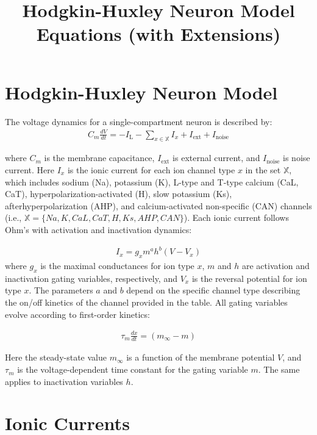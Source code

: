 \documentclass{article}
\begin{document}
\title{Hodgkin-Huxley Neuron Model Equations (with Extensions)}
\author{}
\date{}
\maketitle

\section{Hodgkin-Huxley Neuron Model}
The voltage dynamics for a single-compartment neuron is described by:
\begin{align}
  C_m \frac{dV}{dt} = - I_\mathrm{L} - \sum_{x \in \mathbb{X}} I_x  + I_\mathrm{ext} + I_\mathrm{noise} 
\end{align}

\noindent where $C_m$ is the membrane capacitance, $I_\mathrm{ext}$ is external current, and $I_\mathrm{noise}$ is noise current. Here $I_x$ is the ionic current for each ion channel type $x$ in the set $\mathbb{X}$, which includes sodium (Na), potassium (K), L-type and T-type calcium (CaL, CaT), hyperpolarization-activated (H), slow potassium (Ks), afterhyperpolarization (AHP), and calcium-activated non-specific (CAN) channels (i.e., $\mathbb{X} = \{Na, K, CaL, CaT, H, Ks, AHP, CAN\}$). Each ionic current follows Ohm's with activation and inactivation dynamics:

\begin{align}
  I_x = g_x m^a h^b  (V - V_x)
\end{align}
\noindent where $g_x$ is the maximal conductances for ion type $x$, $m$ and $h$ are activation and inactivation gating variables, respectively, and $V_x$ is the reversal potential for ion type $x$. The parameters $a$ and $b$ depend on the specific channel type describing the on/off kinetics of the channel provided in the table. All gating variables evolve according to first-order kinetics:

\begin{align}
  \tau_m \frac{dx}{dt} = (m_\infty - m)
\end{align}

\noindent Here the steady-state value $m_\infty$ is a function of the membrane potential $V$, and $\tau_m$ is the voltage-dependent time constant for the gating variable $m$. The same applies to inactivation variables $h$.

\section{Ionic Currents}
\end{document}
